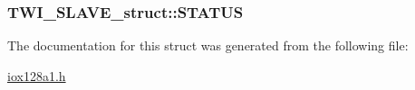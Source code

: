 \label{struct_t_w_i___s_l_a_v_e__struct_a7a233a95d65c4d866e893aed944853a9}
\hypertarget{struct_t_w_i___s_l_a_v_e__struct_a040378c3344b5d83ca9b17edcc208fe5}{
\subsubsection[{STATUS}]{ {\bf TWI\_\-SLAVE\_\-struct::STATUS}}}
\label{struct_t_w_i___s_l_a_v_e__struct_a040378c3344b5d83ca9b17edcc208fe5}


The documentation for this struct was generated from the following file:\begin{DoxyCompactItemize}
\item 
\hyperlink{iox128a1_8h}{iox128a1.h}\end{DoxyCompactItemize}
